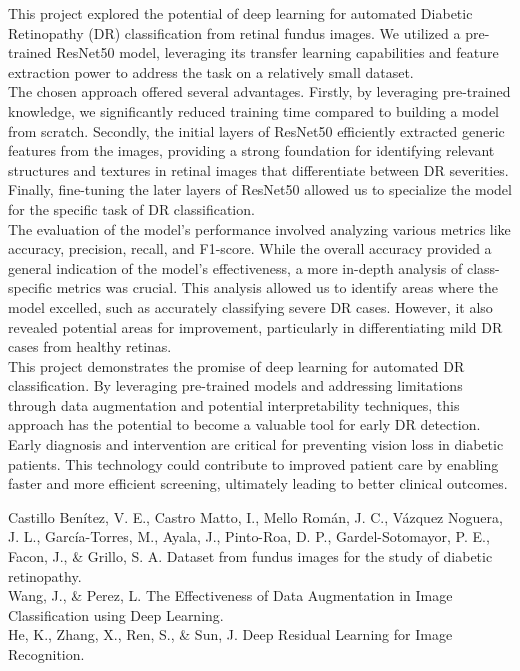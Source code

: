 \documentclass[conference]{IEEEtran}
\begin{document}
This project explored the potential of deep learning for automated Diabetic Retinopathy (DR) classification from retinal fundus images. We utilized a pre-trained ResNet50 model, leveraging its transfer learning capabilities and feature extraction power to address the task on a relatively small dataset. \\

The chosen approach offered several advantages. Firstly, by leveraging pre-trained knowledge, we significantly reduced training time compared to building a model from scratch. Secondly, the initial layers of ResNet50 efficiently extracted generic features from the images, providing a strong foundation for identifying relevant structures and textures in retinal images that differentiate between DR severities. Finally, fine-tuning the later layers of ResNet50 allowed us to specialize the model for the specific task of DR classification. \\

The evaluation of the model's performance involved analyzing various metrics like accuracy, precision, recall, and F1-score. While the overall accuracy provided a general indication of the model's effectiveness, a more in-depth analysis of class-specific metrics was crucial. This analysis allowed us to identify areas where the model excelled, such as accurately classifying severe DR cases. However, it also revealed potential areas for improvement, particularly in differentiating mild DR cases from healthy retinas. \\

This project demonstrates the promise of deep learning for automated DR classification. By leveraging pre-trained models and addressing limitations through data augmentation and potential interpretability techniques, this approach has the potential to become a valuable tool for early DR detection. Early diagnosis and intervention are critical for preventing vision loss in diabetic patients. This technology could contribute to improved patient care by enabling faster and more efficient screening, ultimately leading to better clinical outcomes. \\


\begin{thebibliography}{00}
 Castillo Benítez, V. E., Castro Matto, I., Mello Román, J. C., Vázquez Noguera, J. L., García-Torres, M., Ayala, J., Pinto-Roa, D. P., Gardel-Sotomayor, P. E., Facon, J., \& Grillo, S. A. Dataset from fundus images for the study of diabetic retinopathy.\\

 Wang, J., \& Perez, L. The Effectiveness of Data Augmentation in Image Classification using Deep Learning.\\

 He, K., Zhang, X., Ren, S., \& Sun, J. Deep Residual Learning for Image Recognition.
\end{thebibliography}
\end{document}
